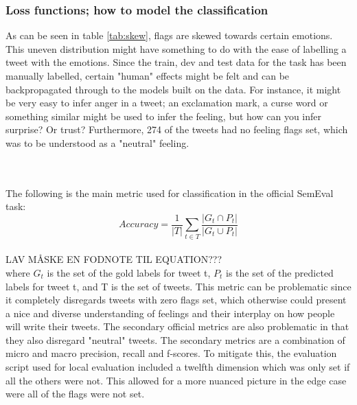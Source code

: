 \subsubsection{Loss functions; how to model the classification}
As can be seen in table \ref{tab:skew}, flags are skewed towards certain emotions. This uneven distribution might have something to do with the ease of labelling a tweet with the emotions. Since the train, dev and test data for the task has been manually labelled, certain "human" effects might be felt and can be backpropagated through to the models built on the data. For instance, it might be very easy to infer anger in a tweet; an exclamation mark, a curse word or something similar might be used to infer the feeling, but how can you infer surprise? Or trust? Furthermore, 274 of the tweets had no feeling flags set, which was to be understood as a "neutral" feeling.\\
\begin{table}[h]
\caption{The actual flags set and percentage of the full classification dataset}
\label{tab:skew}
\end{table}\\
\\
The following is the main metric used for classification in the official SemEval task:\\
\begin{equation} \label{eq:accuracy}
Accuracy = \dfrac{1}{\lvert T \rvert} \sum_{t\in T}\dfrac{\lvert G_{t} \cap P_{t}\rvert}{\lvert G_{t} \cup P_{t}\rvert}
\end{equation}\\
LAV MÅSKE EN FODNOTE TIL EQUATION???\\
where $G_{t}$ is the set of the gold labels for tweet t, $P_{t}$ is the set of the predicted labels for tweet t, and T is the set of tweets. This metric can be problematic since it completely disregards tweets with zero flags set, which otherwise could present a nice and diverse understanding of feelings and their interplay on how people will write their tweets. The secondary official metrics are also problematic in that they also disregard "neutral" tweets. The secondary metrics are a combination of micro and macro precision, recall and f-scores. To mitigate this, the evaluation script used for local evaluation included a twelfth dimension which was only set if all the others were not. This allowed for a more nuanced picture in the edge case were all of the flags were not set.

